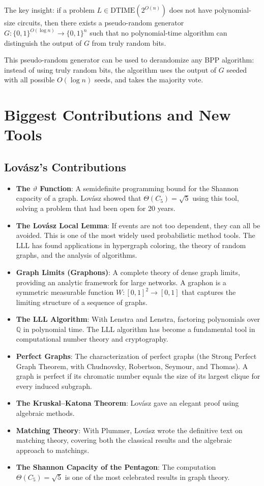 The key insight: if a problem $L \in \text{DTIME}(2^{O(n)})$ does not have polynomial-size circuits, then there exists a pseudo-random generator $G: \{0,1\}^{O(\log n)} \to \{0,1\}^n$ such that no polynomial-time algorithm can distinguish the output of $G$ from truly random bits.

This pseudo-random generator can be used to derandomize any BPP algorithm: instead of using truly random bits, the algorithm uses the output of $G$ seeded with all possible $O(\log n)$ seeds, and takes the majority vote.

\section{Biggest Contributions and New Tools}

\subsection{Lov\'asz's Contributions}

\begin{itemize}
\item \textbf{The $\vartheta$ Function}: A semidefinite programming bound for the Shannon capacity of a graph. Lov\'asz showed that $\Theta(C_5) = \sqrt{5}$ using this tool, solving a problem that had been open for 20 years.
\item \textbf{The Lov\'asz Local Lemma}: If events are not too dependent, they can all be avoided. This is one of the most widely used probabilistic method tools. The LLL has found applications in hypergraph coloring, the theory of random graphs, and the analysis of algorithms.
\item \textbf{Graph Limits (Graphons)}: A complete theory of dense graph limits, providing an analytic framework for large networks. A graphon is a symmetric measurable function $W: [0,1]^2 \to [0,1]$ that captures the limiting structure of a sequence of graphs.
\item \textbf{The LLL Algorithm}: With Lenstra and Lenstra, factoring polynomials over $\mathbb{Q}$ in polynomial time. The LLL algorithm has become a fundamental tool in computational number theory and cryptography.
\item \textbf{Perfect Graphs}: The characterization of perfect graphs (the Strong Perfect Graph Theorem, with Chudnovsky, Robertson, Seymour, and Thomas). A graph is perfect if its chromatic number equals the size of its largest clique for every induced subgraph.
\item \textbf{The Kruskal--Katona Theorem}: Lov\'asz gave an elegant proof using algebraic methods.
\item \textbf{Matching Theory}: With Plummer, Lov\'asz wrote the definitive text on matching theory, covering both the classical results and the algebraic approach to matchings.
\item \textbf{The Shannon Capacity of the Pentagon}: The computation $\Theta(C_5) = \sqrt{5}$ is one of the most celebrated results in graph theory.
\end{itemize}

